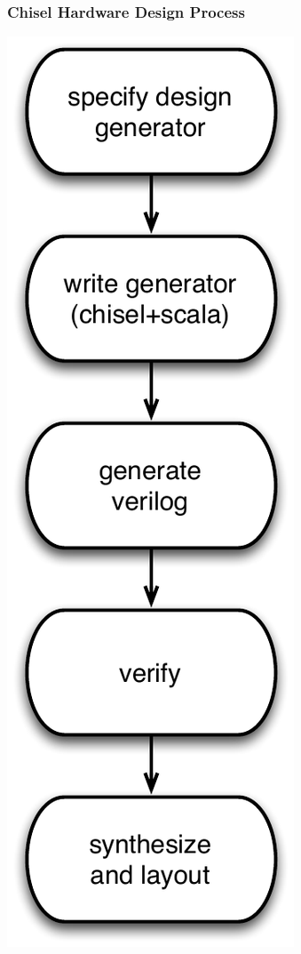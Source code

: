 \documentclass[xcolor=pdflatex,dvipsnames,table]{beamer}
\begin{document}
\begin{frame}

\frametitle{Chisel Hardware Design Process}

\begin{center}
\includegraphics[height=0.9\textheight]{figs/chisel-design-process.pdf}
\end{center}

\end{frame}
\end{document}
